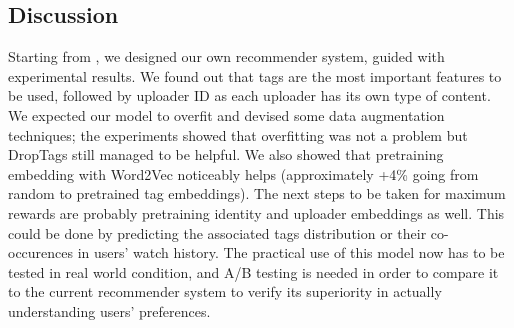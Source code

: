 \subsection{Discussion}

Starting from \citet{youtuberec}, we designed our own recommender system, guided with experimental results. We found out that tags are  the most important features to be used, followed by uploader ID as each uploader has its own type of content. We expected our model to overfit and devised some data augmentation techniques; the experiments showed that overfitting was not a problem but DropTags still managed to be helpful. We also showed that pretraining embedding with Word2Vec noticeably helps (approximately +4\% going from random to pretrained tag embeddings). The next steps to be taken for maximum rewards are probably pretraining identity and uploader embeddings as well. This could be done by predicting the associated tags distribution or their co-occurences in users' watch history. The practical use of this model now has to be tested in real world condition, and A/B testing \cite{abtesting} is needed in order to compare it to the current recommender system to verify its superiority in actually understanding users' preferences.
